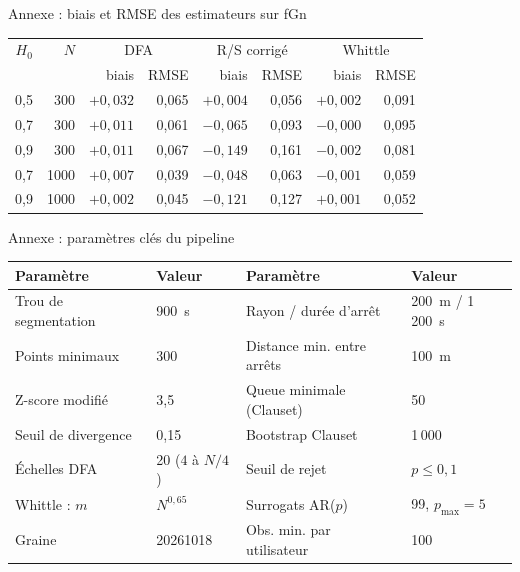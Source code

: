 \documentclass[aspectratio=169,11pt]{beamer}
\begin{document}
\begin{frame}{Annexe : biais et RMSE des estimateurs sur fGn}
\footnotesize
\centering
\begin{tabular}{rrrrrrrr}
\toprule
$H_0$ & $N$ & \multicolumn{2}{c}{DFA} & \multicolumn{2}{c}{R/S corrigé} & \multicolumn{2}{c}{Whittle} \\
 & & biais & RMSE & biais & RMSE & biais & RMSE \\
\midrule
0,5 & 300  & $+0{,}032$ & 0,065 & $+0{,}004$ & 0,056 & $+0{,}002$ & 0,091 \\
0,7 & 300  & $+0{,}011$ & 0,061 & $-0{,}065$ & 0,093 & $-0{,}000$ & 0,095 \\
0,9 & 300  & $+0{,}011$ & 0,067 & $-0{,}149$ & 0,161 & $-0{,}002$ & 0,081 \\
0,7 & 1000 & $+0{,}007$ & 0,039 & $-0{,}048$ & 0,063 & $-0{,}001$ & 0,059 \\
0,9 & 1000 & $+0{,}002$ & 0,045 & $-0{,}121$ & 0,127 & $+0{,}001$ & 0,052 \\
\bottomrule
\end{tabular}
\end{frame}

\begin{frame}{Annexe : paramètres clés du pipeline}
\footnotesize
\begin{tabular}{@{}ll@{\hspace{10mm}}ll@{}}
\toprule
Paramètre & Valeur & Paramètre & Valeur \\
\midrule
Trou de segmentation & 900~s & Rayon / durée d'arrêt & 200~m / 1\,200~s \\
Points minimaux & 300 & Distance min. entre arrêts & 100~m \\
Z-score modifié & 3,5 & Queue minimale (Clauset) & 50 \\
Seuil de divergence & 0,15 & Bootstrap Clauset & 1\,000 \\
Échelles DFA & 20 ($4$ à $N/4$) & Seuil de rejet & $p\le0{,}1$ \\
Whittle : $m$ & $N^{0{,}65}$ & Surrogats AR($p$) & 99, $p_{\max}=5$ \\
Graine & 20261018 & Obs. min. par utilisateur & 100 \\
\bottomrule
\end{tabular}
\end{frame}
\end{document}
